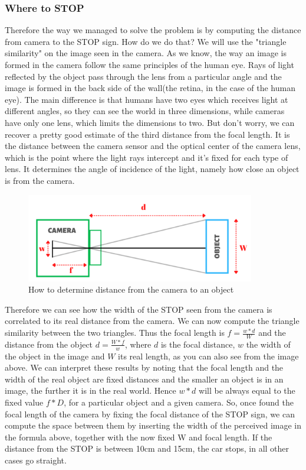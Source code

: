 \documentclass[12pt,a4paper]{article}
\begin{document}
\begin{large}
\subsubsection*{Where to STOP}
Therefore the way we managed to solve the problem is by computing the distance from camera to the STOP sign. How do we do that? We will use the "triangle similarity" on the image seen in the camera. As we know, the way an image is formed in the camera follow the same principles of the human eye. Rays of light reflected by the object pass through the lens  from a particular angle and the image is formed in the back side of the wall(the retina, in the case of the human eye). The main difference is that humans have two eyes which receives light at different angles, so they can see the world in three dimensions, while cameras have only one lens, which limits the dimensions to two. But don't worry, we can recover a pretty good estimate of the third distance from the focal length. It is the distance between the camera sensor and the optical center of the camera lens, which is the point where the light rays intercept and it's fixed for each type of lens. It determines the angle of incidence of the light, namely how close an object is from the camera.

\begin{figure} [!h]
  \centering
  \captionsetup{justification=centering}
  \includegraphics[width=10cm]{images/3D_distance.png}
  \caption{How to determine distance from the camera to an object}
  \end{figure}

Therefore we can see how the width of the STOP seen from the camera is correlated to its real distance from the camera. We can now compute the triangle similarity between the two triangles. Thus the focal length is $f = \frac{w * d}{W}$ and the distance from the object $d = \frac{W * f}{w}$, where $d$ is the focal distance, $w$ the width of the object in the image and $W$ its real length, as you can also see from the image above. We can interpret these results by noting that the focal length and the width of the real object are fixed distances and the smaller an object is in an image, the further it is in the real world. Hence $w*d$ will be always equal to the fixed value $f*D$, for a particular object and a given camera.
So, once found the focal length of the camera by fixing the focal distance of the STOP sign, we can compute the space between them by inserting the width of the perceived image in the formula above, together with the now fixed W and focal length. If the distance from the STOP is between 10cm and 15cm, the car stops, in all other cases go straight.




\end{large}
\end{document}
